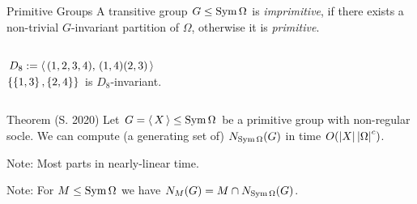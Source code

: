 \documentclass{beamer}
\theoremstyle{plain}
\theoremstyle{definition}
\begin{document}
\begin{frame}{Primitive Groups}
A transitive group $G \leq \operatorname{Sym} \Omega$ is
\emph{imprimitive}, if there exists a non-trivial $G$-invariant partition of
$\Omega$,
otherwise it is \emph{primitive}.

\begin{columns}
\begin{column}{0.5\textwidth}
$D_8 :=  \left\langle \,  (1,2,3,4),\, (1,4)(2,3)  \, \right\rangle $
\\[1em]

$ \left\{   \left\{ 1,3 \right\} ,  \left\{ 2,4 \right\}   \right\} $ is $D_8$-invariant.
\end{column}
\begin{column}{0.3\textwidth}
{
}
\end{column}
\end{columns}
\end{frame}

\begin{frame}%
\begin{block}{Theorem (S. 2020)}
Let $G =  \left\langle \, X \, \right\rangle  \leq \operatorname{Sym} \Omega$ be a primitive group
with non-regular socle.
We can compute (a generating set of) $N_{\operatorname{Sym} \Omega}(G)$
in time $O( \left| X \right|   \left| \Omega \right|  ^ c)$.
\end{block}
\vspace{1em}
Note: Most parts in nearly-linear time.

\vspace{1em}
\pause
Note: For $M \leq \operatorname{Sym} \Omega$ we have
$N_{M}(G) = M \cap N_{\operatorname{Sym} \Omega}(G)$.
\end{frame}
\end{document}

